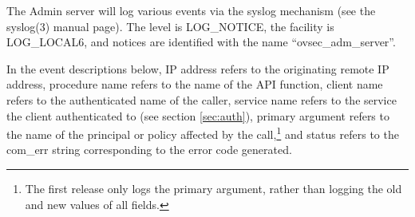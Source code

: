 The Admin server will log various events via the syslog mechanism (see
the syslog(3) manual page).  The level is LOG_NOTICE, the facility is
LOG_LOCAL6, and notices are identified with the name
``ovsec_adm_server''.

In the event descriptions below, IP address refers to the originating
remote IP address, procedure name refers to the name of the API
function, client name refers to the authenticated name of the caller,
service name refers to the service the client authenticated to (see
section \ref{sec:auth}), primary argument refers to the name of the
principal or policy affected by the call,\footnote{The first release
only logs the primary argument, rather than logging the old and new
values of all fields.} and status refers to the com_err string
corresponding to the error code generated.

